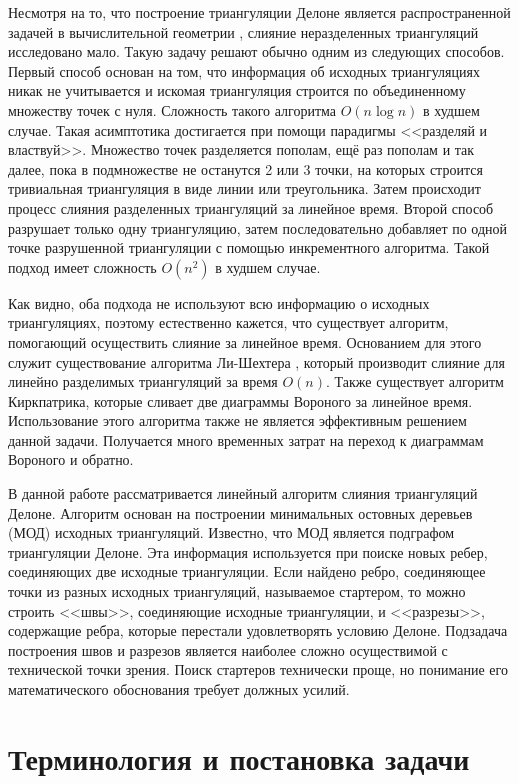 \documentclass[12pt]{article}
\begin{document}
Несмотря на то, что построение триангуляции Делоне является распространенной задачей в вычислительной геометрии \cite{Skvortsov},
слияние неразделенных триангуляций исследовано мало.
Такую задачу решают обычно одним из следующих способов.
Первый способ основан на том, что информация об исходных триангуляциях никак не учитывается и искомая триангуляция строится
по объединенному множеству точек с нуля. Сложность такого алгоритма $O(n\log n)$ в худшем случае.
Такая асимптотика достигается при помощи парадигмы <<разделяй и властвуй>>.
Множество точек разделяется пополам, ещё раз пополам и так далее, пока в подмножестве не останутся 2 или 3 точки,
на которых строится тривиальная триангуляция в виде линии или треугольника.
Затем происходит процесс слияния разделенных триангуляций за линейное время.
Второй способ разрушает только одну триангуляцию,
затем последовательно добавляет по одной точке разрушенной триангуляции с помощью инкрементного алгоритма.
Такой подход имеет сложность $O(n^2)$ в худшем случае.

Как видно, оба подхода не используют всю информацию о исходных триангуляциях,
поэтому естественно кажется, что существует алгоритм, помогающий осуществить слияние за линейное время.
Основанием для этого служит существование алгоритма Ли-Шехтера \cite{Lee},
который производит слияние для линейно разделимых триангуляций за время $O(n)$.
Также существует алгоритм Киркпатрика, которые сливает две диаграммы Вороного за линейное время.
Использование этого алгоритма также не является эффективным решением данной задачи.
Получается много временных затрат на переход к диаграммам Вороного и обратно.

В данной работе рассматривается линейный алгоритм слияния триангуляций Делоне.
Алгоритм основан на построении минимальных остовных деревьев (МОД) исходных триангуляций.
Известно, что МОД является подграфом триангуляции Делоне.
Эта информация используется при поиске новых ребер, соединяющих две исходные триангуляции.
Если найдено ребро, соединяющее точки из разных исходных триангуляций, называемое стартером,
то можно строить <<швы>>, соединяющие исходные триангуляции,
и <<разрезы>>, содержащие ребра, которые перестали удовлетворять условию Делоне.
Подзадача построения швов и разрезов является наиболее сложно осуществимой с технической точки зрения.
Поиск стартеров технически проще, но понимание его математического обоснования
требует должных усилий.

\section{Терминология и постановка задачи}
\end{document}
